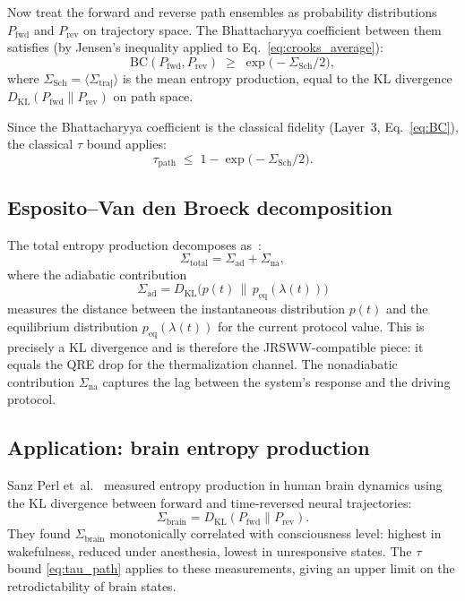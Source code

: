 \documentclass[prl,twocolumn,superscriptaddress,longbibliography,floatfix]{revtex4-2}
\newcommand{\tauasym}{\tau}
\newcommand{\BC}{\mathrm{BC}}
\begin{document}
Now treat the forward and reverse path ensembles as probability
distributions $P_{\text{fwd}}$ and $P_{\text{rev}}$ on trajectory
space. The Bhattacharyya coefficient between them satisfies
(by Jensen's inequality applied to Eq.~\eqref{eq:crooks_average}):
\begin{equation}
\BC(P_{\text{fwd}}, P_{\text{rev}})
\;\geq\; \exp\!\bigl(-\Sigma_{\text{Sch}}/2\bigr),
\label{eq:BC_crooks}
\end{equation}
where $\Sigma_{\text{Sch}} = \langle \Sigma_{\text{traj}} \rangle$
is the mean entropy production, equal to the KL divergence
$D_{\mathrm{KL}}(P_{\text{fwd}} \| P_{\text{rev}})$ on path space.

Since the Bhattacharyya coefficient is the classical fidelity
(Layer~3, Eq.~\eqref{eq:BC}), the classical $\tauasym$ bound
applies:
\begin{equation}
\tauasym_{\text{path}} \;\leq\;
1 - \exp\!\bigl(-\Sigma_{\text{Sch}}/2\bigr).
\label{eq:tau_path}
\end{equation}

\subsection{Esposito--Van den Broeck decomposition}

The total entropy production decomposes
as~\cite{EspositoVdB2010}:
\begin{equation}
\Sigma_{\text{total}}
= \Sigma_{\text{ad}} + \Sigma_{\text{na}},
\label{eq:EVdB}
\end{equation}
where the adiabatic contribution
\begin{equation}
\Sigma_{\text{ad}}
= D_{\mathrm{KL}}\bigl(p(t) \,\big\|\, p_{\text{eq}}(\lambda(t))\bigr)
\label{eq:Sigma_ad}
\end{equation}
measures the distance between the instantaneous distribution $p(t)$
and the equilibrium distribution $p_{\text{eq}}(\lambda(t))$
for the current protocol value. This is precisely a KL divergence
and is therefore the JRSWW-compatible piece: it equals the QRE drop
for the thermalization channel. The nonadiabatic contribution
$\Sigma_{\text{na}}$ captures the lag between the system's response
and the driving protocol.

\subsection{Application: brain entropy production}

Sanz Perl et~al.~\cite{SanzPerl2021} measured entropy production in
human brain dynamics using the KL divergence between forward and
time-reversed neural trajectories:
\begin{equation}
\Sigma_{\text{brain}} = D_{\mathrm{KL}}(P_{\text{fwd}}\|P_{\text{rev}}).
\label{eq:brain_sigma}
\end{equation}
They found $\Sigma_{\text{brain}}$ monotonically correlated with
consciousness level: highest in wakefulness, reduced under
anesthesia, lowest in unresponsive states. The $\tauasym$ bound
\eqref{eq:tau_path} applies to these measurements, giving an upper
limit on the retrodictability of brain states.
\end{document}

